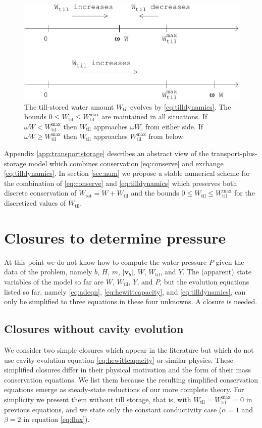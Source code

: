 \documentclass[11pt,final]{amsart}
\newcommand\bv{\mathbf{v}}
\newcommand{\Wtil}{W_{\text{til}}}
\newcommand{\Wtilmax}{W_{\text{til}}^{\text{max}}}
\newcommand{\Wtot}{W_{\text{tot}}}
\begin{document}
\begin{figure}[ht]
\bigskip
\includegraphics[width=4.5in,keepaspectratio=true]{tillschema}
\bigskip
\caption{The till-stored water amount $\Wtil$ evolves by \eqref{eq:tilldynamics}.  The bounds $0\le \Wtil \le \Wtilmax$ are maintained in all situations.  If $\omega W < \Wtilmax$ then $\Wtil$ approaches $\omega W$, from either side.  If $\omega W \ge \Wtilmax$ then $\Wtil$ approaches $\Wtilmax$ from below.}
\label{fig:tillschema}
\end{figure}

Appendix \ref{app:transportstorage} describes an abstract view of the transport-plus-storage model which combines conservation \eqref{eq:conserve} and exchange \eqref{eq:tilldynamics}.  In section \ref{sec:num} we propose a stable numerical scheme for the combination of \eqref{eq:conserve} and \eqref{eq:tilldynamics} which preserves both discrete conservation of $\Wtot=W+\Wtil$ and the bounds $0\le \Wtil \le \Wtilmax$ for the discretized values of $\Wtil$.  


\section{Closures to determine pressure} \label{sec:closures}

At this point we do not know how to compute the water pressure $P$ given the data of the problem, namely $b$, $H$, $m$, $|\bv_b|$, $W$, $\Wtil$, and $Y$.  The (apparent) state variables of the model so far are $W$, $\Wtil$, $Y$, and $P$, but the evolution equations listed so far, namely \eqref{eq:adeqn}, \eqref{eq:hewittcapacity}, and \eqref{eq:tilldynamics}, can only be simplified to three equations in these four unknowns.   A closure is needed.

\subsection*{Closures without cavity evolution}  We consider two simple closures which appear in the literature but which do not use cavity evolution equation \eqref{eq:hewittcapacity} or similar physics.  These simplified closures differ in their physical motivation and the form of their mass conservation equations.  We list them because the resulting simplified conservation equations emerge as steady-state reductions of our more complete theory.  For simplicity we present them without till storage, that is, with $\Wtil=\Wtilmax=0$ in previous equations, and we state only the constant conductivity case ($\alpha=1$ and $\beta=2$ in equation \eqref{eq:flux}).
\end{document}
